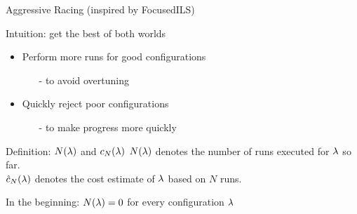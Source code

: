 \begin{frame}[c,fragile]{Aggressive Racing (inspired by FocusedILS) }

{Intuition: get the best of both worlds}

\begin{itemize}
	\item Perform more runs for good configurations
	\begin{itemize}
		\item[-] to avoid overtuning
	\end{itemize}
	\item Quickly reject poor configurations
	\begin{itemize}
		\item[-] to make progress more quickly
	\end{itemize}
\end{itemize}

\pause
\medskip

\begin{block}{Definition: $N(\mathbf{\lambda})$ and $c_N(\mathbf{\lambda})$}
\alert{$N(\mathbf{\lambda})$} denotes the number of runs executed for $\mathbf{\lambda}$ so far.\\
\alert{$\hat{c}_N(\mathbf{\lambda})$} denotes the cost estimate of $\mathbf{\lambda}$ based on $N$ runs.
\end{block}

\pause
In the beginning: $N(\mathbf{\lambda})=0$ for every configuration $\mathbf{\lambda}$

\end{frame}




